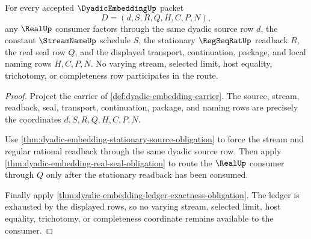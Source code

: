 \begin{theorem}
\label{thm:dyadic-embedding-source-window-seal-factorization}
For every accepted $\DyadicEmbeddingUp$ packet
$$
D=(d,S,R,Q,H,C,P,N),
$$
any $\RealUp$ consumer factors through the same dyadic source row $d$, the constant $\StreamNameUp$ schedule $S$, the stationary $\RegSeqRatUp$ readback $R$, the real seal row $Q$, and the displayed transport, continuation, package, and local naming rows $H,C,P,N$. No varying stream, selected limit, host equality, trichotomy, or completeness row participates in the route.
\end{theorem}
\begin{proof}
Project the carrier of \autoref{def:dyadic-embedding-carrier}. The source, stream, readback, seal, transport, continuation, package, and naming rows are precisely the coordinates $d,S,R,Q,H,C,P,N$.

Use \autoref{thm:dyadic-embedding-stationary-source-obligation} to force the stream and regular rational readback through the same dyadic source row. Then apply \autoref{thm:dyadic-embedding-real-seal-obligation} to route the $\RealUp$ consumer through $Q$ only after the stationary readback has been consumed.

Finally apply \autoref{thm:dyadic-embedding-ledger-exactness-obligation}. The ledger is exhausted by the displayed rows, so no varying stream, selected limit, host equality, trichotomy, or completeness coordinate remains available to the consumer.
\end{proof}

